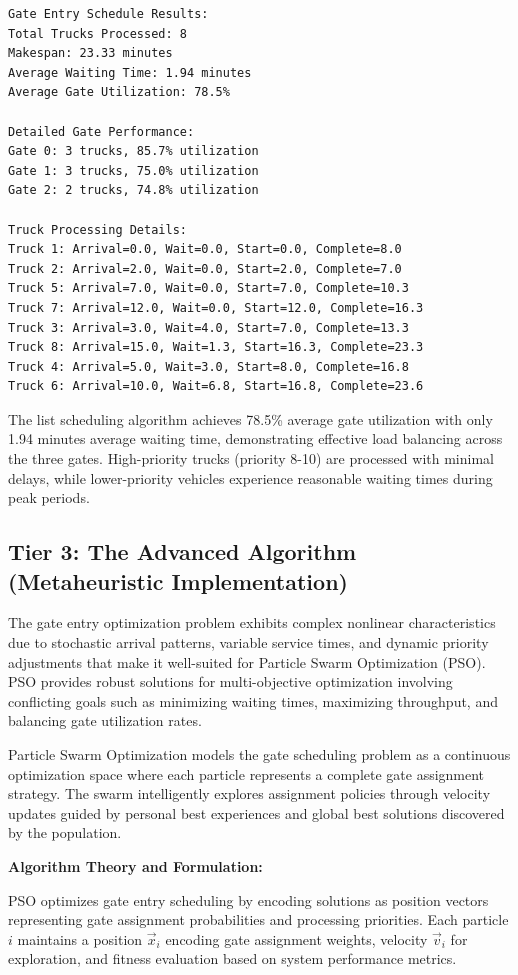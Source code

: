 \documentclass{article}
\begin{document}
\begin{verbatim}
Gate Entry Schedule Results:
Total Trucks Processed: 8
Makespan: 23.33 minutes
Average Waiting Time: 1.94 minutes
Average Gate Utilization: 78.5%

Detailed Gate Performance:
Gate 0: 3 trucks, 85.7% utilization
Gate 1: 3 trucks, 75.0% utilization  
Gate 2: 2 trucks, 74.8% utilization

Truck Processing Details:
Truck 1: Arrival=0.0, Wait=0.0, Start=0.0, Complete=8.0
Truck 2: Arrival=2.0, Wait=0.0, Start=2.0, Complete=7.0
Truck 5: Arrival=7.0, Wait=0.0, Start=7.0, Complete=10.3
Truck 7: Arrival=12.0, Wait=0.0, Start=12.0, Complete=16.3
Truck 3: Arrival=3.0, Wait=4.0, Start=7.0, Complete=13.3
Truck 8: Arrival=15.0, Wait=1.3, Start=16.3, Complete=23.3
Truck 4: Arrival=5.0, Wait=3.0, Start=8.0, Complete=16.8
Truck 6: Arrival=10.0, Wait=6.8, Start=16.8, Complete=23.6
\end{verbatim}

The list scheduling algorithm achieves 78.5\% average gate utilization with only 1.94 minutes average waiting time, demonstrating effective load balancing across the three gates. High-priority trucks (priority 8-10) are processed with minimal delays, while lower-priority vehicles experience reasonable waiting times during peak periods.

\subsection{Tier 3: The Advanced Algorithm (Metaheuristic Implementation)}

The gate entry optimization problem exhibits complex nonlinear characteristics due to stochastic arrival patterns, variable service times, and dynamic priority adjustments that make it well-suited for Particle Swarm Optimization (PSO). PSO provides robust solutions for multi-objective optimization involving conflicting goals such as minimizing waiting times, maximizing throughput, and balancing gate utilization rates.

Particle Swarm Optimization models the gate scheduling problem as a continuous optimization space where each particle represents a complete gate assignment strategy. The swarm intelligently explores assignment policies through velocity updates guided by personal best experiences and global best solutions discovered by the population.

\textbf{Algorithm Theory and Formulation:}

PSO optimizes gate entry scheduling by encoding solutions as position vectors representing gate assignment probabilities and processing priorities. Each particle $i$ maintains a position $\vec{x}_i$ encoding gate assignment weights, velocity $\vec{v}_i$ for exploration, and fitness evaluation based on system performance metrics.
\end{document}
